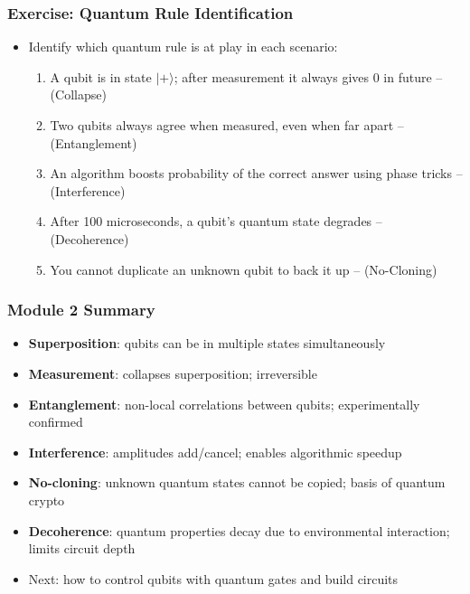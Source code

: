 \begin{frame}[fragile]\frametitle{Exercise: Quantum Rule Identification}
\begin{itemize}
\item Identify which quantum rule is at play in each scenario:
\begin{enumerate}
  \item A qubit is in state $|+\rangle$; after measurement it always gives 0 in future -- (Collapse)
  \item Two qubits always agree when measured, even when far apart -- (Entanglement)
  \item An algorithm boosts probability of the correct answer using phase tricks -- (Interference)
  \item After 100 microseconds, a qubit's quantum state degrades -- (Decoherence)
  \item You cannot duplicate an unknown qubit to back it up -- (No-Cloning)
\end{enumerate}
\end{itemize}
\end{frame}

\begin{frame}[fragile]\frametitle{Module 2 Summary}
\begin{itemize}
\item \textbf{Superposition}: qubits can be in multiple states simultaneously
\item \textbf{Measurement}: collapses superposition; irreversible
\item \textbf{Entanglement}: non-local correlations between qubits; experimentally confirmed
\item \textbf{Interference}: amplitudes add/cancel; enables algorithmic speedup
\item \textbf{No-cloning}: unknown quantum states cannot be copied; basis of quantum crypto
\item \textbf{Decoherence}: quantum properties decay due to environmental interaction; limits circuit depth
\item Next: how to control qubits with quantum gates and build circuits
\end{itemize}
\end{frame}
